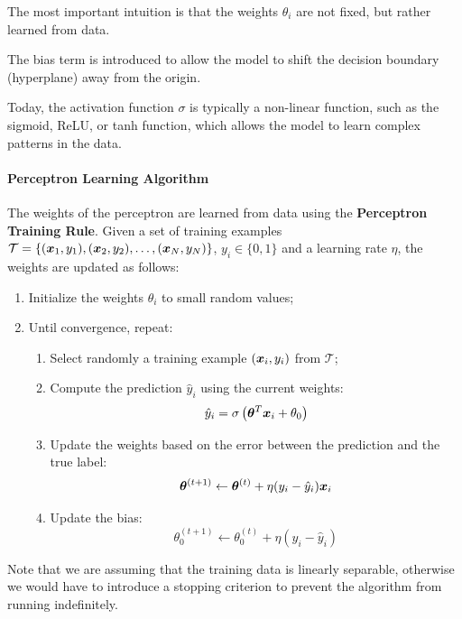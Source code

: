 The most important intuition is that the weights $\theta_i$ are not fixed, but rather learned from data.

The bias term is introduced to allow the model to shift the decision boundary (hyperplane) away from the origin.

Today, the activation function $\sigma$ is typically a non-linear function, such as the sigmoid, ReLU, or tanh function,
which allows the model to learn complex patterns in the data.

\paragraph{Perceptron Learning Algorithm}
\label{perceptron-training}
The weights of the perceptron are learned from data using the \textbf{Perceptron Training Rule}.
Given a set of training examples $\mathcal{T} = \{(\boldsymbol{x}_1, y_1), (\boldsymbol{x}_2, y_2), \ldots, (\boldsymbol{x}_N, y_N)\}$, $y_i \in \{0, 1\}$
and a learning rate $\eta$, the weights are updated as follows:
\begin{enumerate}
    \item Initialize the weights $\theta_i$ to small random values;
    \item Until convergence, repeat:
    \begin{enumerate}
        \item Select randomly a training example $(\boldsymbol{x}_i, y_i)$ from $\mathcal{T}$;
        \item Compute the prediction $\hat{y}_i$ using the current weights:
        \[ \hat{y}_i = \sigma\left(\boldsymbol{\theta}^T \boldsymbol{x}_i + \theta_0 \right) \]
        \item Update the weights based on the error between the prediction and the true label:
        \[ \boldsymbol{\theta}^{(t+1)} \leftarrow \boldsymbol{\theta}^{(t)} + \eta (y_i - \hat{y}_i) \boldsymbol{x}_i \]
        \item Update the bias:
        \[ \theta_0^{(t+1)} \leftarrow \theta_0^{(t)} + \eta (y_i - \hat{y}_i) \]
    \end{enumerate}
\end{enumerate}
Note that we are assuming that the training data is linearly separable, otherwise we would have to introduce a stopping criterion to prevent the algorithm from running indefinitely.

